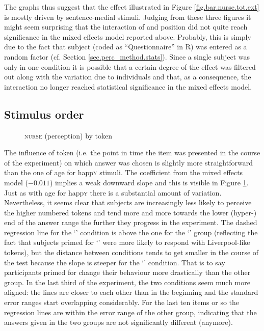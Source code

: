 The graphs thus suggest that the  effect illustrated in Figure \ref{fig.bar.nurse.tot.ext} is mostly driven by sentence-medial stimuli.
Judging from these three figures  it might seem surprising that the interaction of  and position did not quite reach significance in the mixed effects model reported above.
Probably, this is simply due to the fact that subject (coded as ``Questionnaire'' in R) was entered as a random factor (cf. Section \ref{sec.perc_method.stats}).
Since a single subject was only in one  condition it is possible that a certain degree of the  effect was filtered out along with the variation due to individuals and that, as a consequence, the interaction no longer reached statistical significance in the mixed effects model.

\subsection{Stimulus order}
\label{sec.perc_res.nurse.order}

\begin{figure}[h]
	\centering
		\resizebox{.49\linewidth}{!}{} 
	\caption{\textsc{nurse} (perception) by token}
	\label{fig.scatter.nurse.ext.token}
\end{figure}

The influence of token (i.e. the point in time the item was presented in the course of the experiment) on which answer was chosen is slightly more straightforward than the one of age for happ\textsc{y} stimuli.
The coefficient from the mixed effects model (\ensuremath{-0.011}) implies a weak downward slope and this is visible in Figure \ref{fig.scatter.nurse.ext.token}.
Just as with age for happ\textsc{y} there is a substantial amount of variation.
Nevertheless, it seems clear that subjects are increasingly less likely to perceive the higher numbered tokens and tend more and more towards the lower (hyper-) end of the answer range the further they progress in the experiment.
The dashed regression line for the `'  condition is above the one for the `' group (reflecting the fact that subjects primed for `' were more likely to respond with Liverpool-like tokens), but the distance between conditions tends to get smaller in the course of the test because the slope is steeper for the `' condition. That is to say participants primed for  change their behaviour more drastically than the other group.
In the last third of the experiment, the two conditions seem much more aligned: the lines are closer to each other than in the beginning and the standard error ranges start overlapping considerably.
For the last ten items or so the regression lines are within the error range of the other group, indicating that the answers given in the two groups are not significantly different (anymore).

